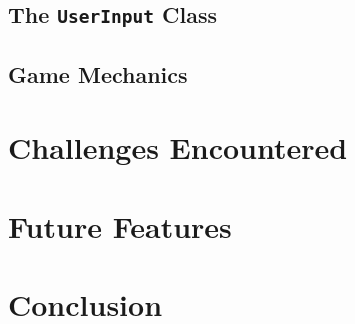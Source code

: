 \documentclass[pageno]{jpaper}
\begin{document}
\begin{doublespacing}
\hypertarget{sec:the_userinput_class}{}
\subsection{The \lstinline$UserInput$ Class}

\hypertarget{sec:game_mechanics}{}
\subsection{Game Mechanics}

\hypertarget{sec:challenges_encountered}{}
\section{Challenges Encountered}

\hypertarget{sec:future_features}{}
\section{Future Features}


\hypertarget{sec:conclusion}{}
\section{Conclusion}

\end{doublespacing} 


\end{document}
